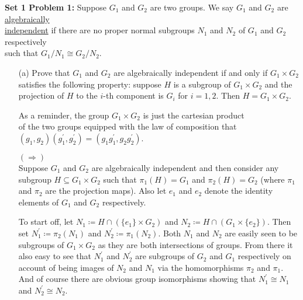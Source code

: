 \documentclass{book}
\newcommand{\exPPP}{%
   \color{VioletRed}%
   \fontsize{12}{14}\selectfont%
}
\newcommand{\HexOne}{%
   \color{Purple}%
   \fontsize{12}{13}\selectfont%
}
\newenvironment{myIndent}{%
   \begin{adjustwidth}{2.5em}{0em}%
}{%
   \end{adjustwidth}%
}
\newenvironment{myDindent}{%
   \begin{adjustwidth}{5em}{0em}%
}{%
   \end{adjustwidth}%
}
\newcommand{\udefine}[1]{{%
   \setulcolor{Red}%
   \setul{0.14em}{0.07em}%
   \ul{#1}%
}}
\newcommand{\blab}[1]{\textbf{#1}}
\newcommand{\retTwo}{\hfill\bigbreak}
\begin{document}
\blab{Set 1 Problem 1:} Suppose $G_1$ and $G_2$ are two groups. We say $G_1$ and $G_2$ are \udefine{algebraically\\ independent} if there are no proper normal subgroups $N_1$ and $N_2$ of $G_1$ and $G_2$ respectively\\ such that $G_1/N_1 \cong G_2/N_2$.\newpage
\begin{enumerate}
	\item[(a)] Prove that $G_1$ and $G_2$ are algebraically independent if and only if $G_1 \times G_2$ satisfies the following property: suppose $H$ is a subgroup of $G_1 \times G_2$ and the projection of $H$ to the $i$-th component is $G_i$ for $i = 1, 2$. Then $H = G_1 \times G_2$.
	\begin{myIndent}\HexOne
		\begin{myDindent}\exPPP
			As a reminder, the group $G_1 \times G_2$ is just the cartesian product\\ of the two groups equipped with the law of composition that\\ $(g_1, g_2)(g_1^\prime, g_2^\prime) = (g_1g_1^\prime, g_2g_2^\prime)$.\retTwo
		\end{myDindent}
		
		$(\Longrightarrow)$\\
		Suppose $G_1$ and $G_2$ are algebraically independent and then consider any subgroup $H \subseteq G_1 \times G_2$ such that $\pi_1(H) = G_1$ and $\pi_2(H) = G_2$ (where $\pi_1$ and $\pi_2$ are the projection maps). Also let $e_1$ and $e_2$ denote the identity elements of $G_1$ and $G_2$ respectively.\retTwo

		To start off, let $N_1 \coloneqq H \cap (\{e_1\} \times G_2)$ and $N_2 \coloneqq H \cap (G_1 \times \{e_2\})$. Then set $N_1^\prime \coloneqq \pi_2(N_1)$ and $N_2^\prime \coloneqq \pi_1(N_2)$. Both $N_1$ and $N_2$ are easily seen to be subgroups of $G_1 \times G_2$ as they are both intersections of groups. From there it also easy to see that $N_1^\prime$ and $N_2^\prime$ are subgroups of $G_2$ and $G_1$ respectively on account of being images of $N_2$ and $N_1$ via the homomorphisms $\pi_2$ and $\pi_1$. And of course there are obvious group isomorphisms showing that $N_1^\prime \cong N_1$ and $N_2^\prime \cong N_2$.
		\retTwo


\end{myIndent}
\end{enumerate}
\end{document}
